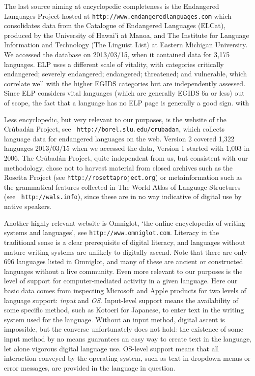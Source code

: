 \documentclass[10pt]{article}
\begin{document}
The last source aiming at encyclopedic completeness is the Endangered
Languages Project hosted at {\tt http://www.endangeredlanguages.com} which consolidates
data from the Catalogue of Endangered Languages (ELCat), produced by the
University of Hawai'i at Manoa, and The Institute for Language Information and
Technology (The Linguist List) at Eastern Michigan University. We accessed the
database on 2013/03/15, when it contained data for 3,175 languages. ELP uses 
a different scale of vitality, with categories critically endangered; 
severely endangered; endangered; threatened; and vulnerable, which correlate 
well with the higher EGIDS categories but are independently assessed. Since 
ELP considers vital languages (which are generally EGIDS 6a or less) out of 
scope, the fact that a language has no ELP page is generally a good sign. with 

Less encyclopedic, but very relevant to our purposes, is the website of the
Cr\'ubad\'an Project, see {\tt
  http://borel.slu.edu/crubadan}, which collects language data for endangered
languages on the web. Version 2 covered 1,322 languages 2013/03/15 when we
accessed the data, Version 1 started with 1,003 in 2006.  The Cr\'ubad\'an
Project, quite independent from us, but consistent with our methodology, chose
not to harvest material from closed archives such as the Rosetta Project (see
{\tt http://rosettaproject.org}) or metainformation such as the grammatical
features collected in The World Atlas of Language Structures (see {\tt
  http://wals.info}), since these are in no way indicative of digital use by
native speakers.

Another highly relevant website is Omniglot, `the online encyclopedia of
writing systems and languages', see {\tt http://www.omniglot.com}. Literacy in
the traditional sense is a clear prerequisite of digital literacy, and
languages without mature writing systems are unlikely to {\color{black}
  digitally ascend}.  Note that there are only 696 languages listed in
Omniglot, and many of these are ancient or constructed languages without a
live community.  Even more relevant to our purposes is the level of support
for computer-mediated activity in a given language. Here our basic data comes
from inspecting Microsoft and Apple products for two levels of language
support: {\it input} and {\it OS}. Input-level support means the availability
of some specific method, such as Kotoeri for Japanese, to enter text in the
writing system used for the language. Without an input method, digital
{\color{black} ascent is impossible,} but the converse unfortunately does not
hold: the existence of some input method by no means guarantees an easy way to
create text in the language, let alone vigorous digital language use. OS-level
support means that all interaction conveyed by the operating system, such as
text in dropdown menus or error messages, are provided in the language in
question.
\end{document}
